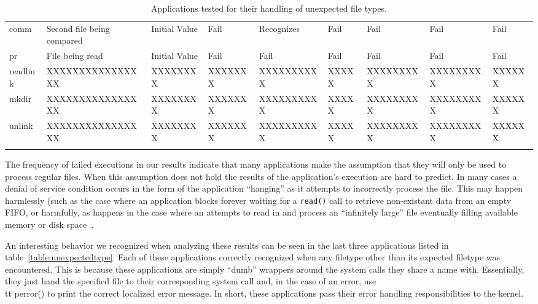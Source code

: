 \begin{table}[t]
\begin{tabular}{l  l  |  l  l  l  l  l  l  l}
        comm        & Second file being compared & Initial Value  & Fail           & Recognizes  & Fail       & Fail        & Fail       & Fail\\
        pr          & File being read            & Initial Value  & Fail           & Fail        & Fail       & Fail        & Fail       & Fail\\
        readlink    & XXXXXXXXXXXXXXXX           & XXXXXXXX       & XXXXXXX        & XXXXXXXXXX  & XXXXX      & XXXXXXXXX   & XXXXXXXXX  & XXXXXX\\
        mkdir       & XXXXXXXXXXXXXXXX           & XXXXXXXX       & XXXXXXX        & XXXXXXXXXX  & XXXXX      & XXXXXXXXX   & XXXXXXXXX  & XXXXXX\\
        unlink      & XXXXXXXXXXXXXXXX           & XXXXXXXX       & XXXXXXX        & XXXXXXXXXX  & XXXXX      & XXXXXXXXX   & XXXXXXXXX  & XXXXXX\\
    \bottomrule{}
    \end{tabular}
    \caption{Applications tested for their handling of unexpected file types.
}
    \label{table:unexpectedtypes}
\end{table}

The frequency of failed executions in our results indicate that many
applications make the assumption that they will only be used to process
regular files.  When this assumption does not hold the results of the
application's execution are hard to predict.  In many cases a denial of
service condition occurs in the form of the application ``hanging'' as it
attempts to incorrectly process the file.  This may happen harmlessly (such
as the case where an application blocks forever waiting for a {\tt read()}
call to retrieve non-existant data from an empty FIFO, or harmfully, as
happens in the case where an attempts to read in and process an
``infinitely large'' file eventually filling available memory or disk
space~\cite{Cappos_CCS_08}.  


An interesting behavior we recognized when analyzing these results can be seen
in the last three applications listed in table~\ref{table:unexpectedtype}.  Each of these
applications correctly recognized when any filetype other than its expected
filetype was encountered.  This is because these applications are simply ``dumb'' wrappers
around the system calls they share a name with.  Essentially, they just hand
the specified file to their corresponding system call and, in the case of an
error, use {\\tt perror()} to print the correct localized error message.  In
short, these applications pass their error handling responsibilities to the
kernel.

